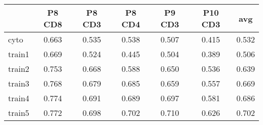 \begin{tabular}{lcccccc}
   \hline  &P8 CD8& P8 CD3& P8 CD4& P9 CD3& P10 CD3& avg\\ 
\hline
cyto & 0.663 & 0.535 & 0.538 & 0.507 & 0.415 & 0.532 \\ 
  train1 & 0.669 & 0.524 & 0.445 & 0.504 & 0.389 & 0.506 \\ 
  train2 & 0.753 & 0.668 & 0.588 & 0.650 & 0.536 & 0.639 \\ 
  train3 & 0.768 & 0.679 & 0.685 & 0.659 & 0.557 & 0.669 \\ 
  train4 & 0.774 & 0.691 & 0.689 & 0.697 & 0.581 & 0.686 \\ 
  train5 & 0.772 & 0.698 & 0.702 & 0.710 & 0.626 & 0.702 \\ 
   \hline
\end{tabular}
